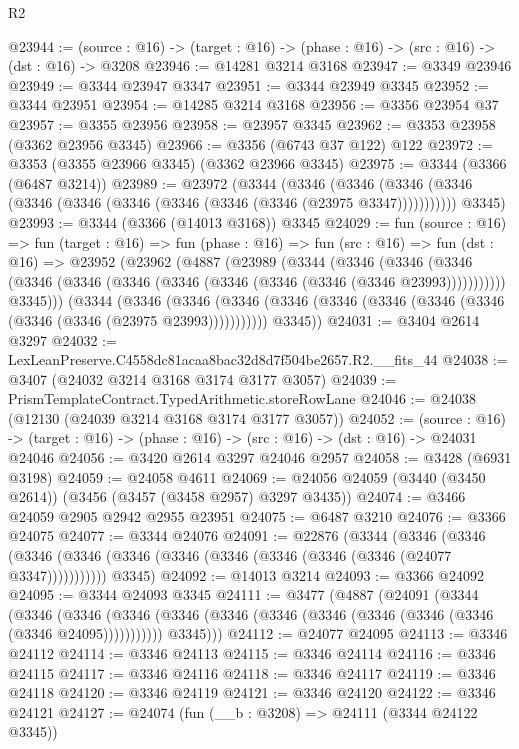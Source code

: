 \begin{lexlean}{R2}
\begin{coremodule}
@23944 := (source : @16) -> (target : @16) -> (phase : @16) -> (src : @16) -> (dst : @16) -> @3208
@23946 := @14281 @3214 @3168
@23947 := @3349 @23946
@23949 := @3344 @23947 @3347
@23951 := @3344 @23949 @3345
@23952 := @3344 @23951
@23954 := @14285 @3214 @3168
@23956 := @3356 @23954 @37
@23957 := @3355 @23956
@23958 := @23957 @3345
@23962 := @3353 @23958 (@3362 @23956 @3345)
@23966 := @3356 (@6743 @37 @122) @122
@23972 := @3353 (@3355 @23966 @3345) (@3362 @23966 @3345)
@23975 := @3344 (@3366 (@6487 @3214))
@23989 := @23972
    (@3344
      (@3346 (@3346 (@3346 (@3346 (@3346 (@3346 (@3346 (@3346 (@3346 (@3346 (@23975 @3347)))))))))))
      @3345)
@23993 := @3344 (@3366 (@14013 @3168)) @3345
@24029 := fun (source : @16) =>
  fun (target : @16) =>
  fun (phase : @16) =>
  fun (src : @16) =>
  fun (dst : @16) =>
  @23952
    (@23962
      (@4887
        (@23989
          (@3344
            (@3346
              (@3346
                (@3346 (@3346 (@3346 (@3346 (@3346 (@3346 (@3346 (@3346 (@3346 @23993)))))))))))
            @3345)))
      (@3344
        (@3346
          (@3346 (@3346 (@3346 (@3346 (@3346 (@3346 (@3346 (@3346 (@3346 (@23975 @23993)))))))))))
        @3345))
@24031 := @3404 @2614 @3297
@24032 := LexLeanPreserve.C4558dc81acaa8bac32d8d7f504be2657.R2.__fits_44
@24038 := @3407 (@24032 @3214 @3168 @3174 @3177 @3057)
@24039 := PrismTemplateContract.TypedArithmetic.storeRowLane
@24046 := @24038 (@12130 (@24039 @3214 @3168 @3174 @3177 @3057))
@24052 := (source : @16) ->
  (target : @16) -> (phase : @16) -> (src : @16) -> (dst : @16) -> @24031 @24046
@24056 := @3420 @2614 @3297 @24046 @2957
@24058 := @3428 (@6931 @3198)
@24059 := @24058 @4611
@24069 := @24056 @24059 (@3440 (@3450 @2614)) (@3456 (@3457 (@3458 @2957) @3297 @3435))
@24074 := @3466 @24059 @2905 @2942 @2955 @23951
@24075 := @6487 @3210
@24076 := @3366 @24075
@24077 := @3344 @24076
@24091 := @22876
    (@3344
      (@3346 (@3346 (@3346 (@3346 (@3346 (@3346 (@3346 (@3346 (@3346 (@3346 (@24077 @3347)))))))))))
      @3345)
@24092 := @14013 @3214
@24093 := @3366 @24092
@24095 := @3344 @24093 @3345
@24111 := @3477
    (@4887
      (@24091
        (@3344
          (@3346
            (@3346 (@3346 (@3346 (@3346 (@3346 (@3346 (@3346 (@3346 (@3346 (@3346 @24095)))))))))))
          @3345)))
@24112 := @24077 @24095
@24113 := @3346 @24112
@24114 := @3346 @24113
@24115 := @3346 @24114
@24116 := @3346 @24115
@24117 := @3346 @24116
@24118 := @3346 @24117
@24119 := @3346 @24118
@24120 := @3346 @24119
@24121 := @3346 @24120
@24122 := @3346 @24121
@24127 := @24074 (fun (__b : @3208) => @24111 (@3344 @24122 @3345))

\end{coremodule}
\end{lexlean}
